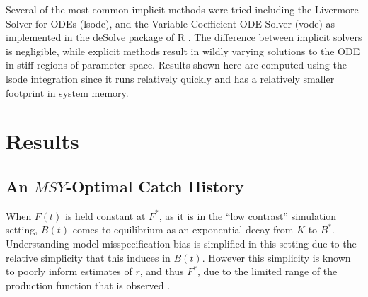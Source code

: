 %
Several of the most common implicit methods were tried including the
Livermore Solver for ODEs (lsode), and the Variable Coefficient ODE Solver
(vode) as implemented in the deSolve package of R \cite{soetaert_solving_2010}.
The difference between implicit solvers is negligible, while explicit
methods result in wildly varying solutions to the ODE in stiff regions of
parameter space. %
Results shown here are computed using the lsode integration %
since it runs relatively quickly and has a relatively smaller footprint in system memory.


%
%

%
\clearpage

\section{Results}

%
\subsection{An $MSY$-Optimal Catch History \label{flat}}

%
When $F(t)$ is held constant at $F^*$, as it is in the ``low contrast''
simulation setting, $B(t)$ comes to equilibrium as an exponential decay from
$K$ to $B^*$. Understanding model misspecification bias is simplified in this
setting due to the relative simplicity that this induces in $B(t)$. However
this simplicity is known to poorly inform estimates of $r$, and thus $F^*$,
due to the limited range of the production function that is observed
\cite{hilborn_quantitative_1992}.


